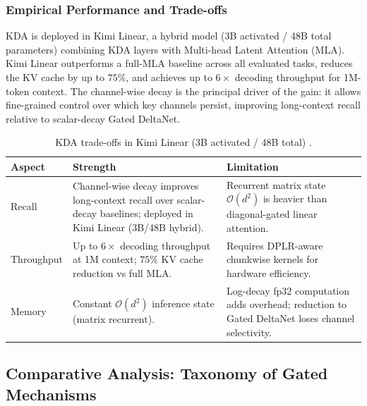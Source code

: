 \subsubsection{Empirical Performance and Trade-offs}

KDA is deployed in Kimi Linear, a hybrid model (3B activated / 48B total parameters) combining KDA layers with Multi-head Latent Attention (MLA). Kimi Linear outperforms a full-MLA baseline across all evaluated tasks, reduces the KV cache by up to $75\%$, and achieves up to $6\times$ decoding throughput for 1M-token context. The channel-wise decay is the principal driver of the gain: it allows fine-grained control over which key channels persist, improving long-context recall relative to scalar-decay Gated DeltaNet.

\begin{table}[H]
\centering
\footnotesize
\begin{tabularx}{\linewidth}{lXX}
\toprule
\textbf{Aspect} & \textbf{Strength} & \textbf{Limitation} \\
\midrule
Recall & Channel-wise decay improves long-context recall over scalar-decay baselines; deployed in Kimi Linear (3B/48B hybrid). & Recurrent matrix state $\mathcal{O}(d^2)$ is heavier than diagonal-gated linear attention. \\
Throughput & Up to $6\times$ decoding throughput at 1M context; $75\%$ KV cache reduction vs full MLA. & Requires DPLR-aware chunkwise kernels for hardware efficiency. \\
Memory & Constant $\mathcal{O}(d^2)$ inference state (matrix recurrent). & Log-decay fp32 computation adds overhead; reduction to Gated DeltaNet loses channel selectivity. \\
\bottomrule
\end{tabularx}
\caption{KDA trade-offs in Kimi Linear (3B activated / 48B total) \citep{kimi_kda_2025}.}
\label{tab:kda-tradeoffs}
\end{table}

\normalsize

\subsection{Comparative Analysis: Taxonomy of Gated Mechanisms}

